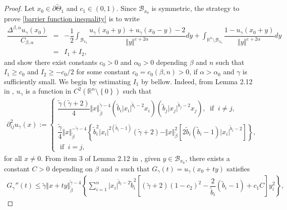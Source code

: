 \documentclass[10pt, leqno]{article}
\theoremstyle{definition}
\theoremstyle{remark}
\numberwithin{equation}{section}
\begin{document}
\begin{proof}
Let $x_{0} \in \partial \tilde{\Theta}_{1}$ and $c_{1} \in \left(0,1 \right)$. Since $\mathcal{B}_{x_{0}}$ is symmetric, the strategy to prove \eqref{barrier function inequality} is to write
\begin{eqnarray}
\label{barrier function inequality 1}
\dfrac{\Delta^{\beta, \alpha} u_{\gamma}(x_{0})}{C_{\beta, \alpha}}& = & \nonumber -\dfrac{1}{2}\displaystyle \int_{\mathcal{B}_{x_{0}}} \dfrac{u_{\gamma}\left( x_{0} + y \right) + u_{\gamma}\left( x_{0} - y \right) - 2}{\Vert y \Vert^{c_{} + 2\alpha}} dy + \displaystyle \int_{\mathbb{R}^{n} \setminus \mathcal{B}_{x_{0}}} \dfrac{1 - u_{\gamma}\left( x_{0} + y\right)}{\Vert y \Vert^{c_{} + 2\alpha}} dy \\
& = & I_{1} + I_{2},
\end{eqnarray}
and show there exist constants $c_{0} > 0$ and $\alpha_{0}>0$ depending $\beta$ and $n$ such that $I_{1} \geq c_{0}$ and $ I_{2}  \geq - c_{0}/2$ for some constant $c_{0}=c_{0}(\beta, n)>0$, if $\alpha > \alpha_{0}$ and $\gamma$ is sufficiently small. We begin by estimating $I_{1}$ by bellow. Indeed, from Lemma 2.12 in \cite{LEITAO LP}, $u_{\gamma}$ is a function in $C^{2}(\mathbb{R}^{n}\setminus \left\lbrace 0 \right\rbrace)$ such that
\begin{eqnarray}
\partial^{2}_{ij}u_{\gamma}(x):= \left \{
\begin{array}{ll}
\dfrac{\tilde{\gamma}(\tilde{\gamma}+2)}{4}\Vert x \Vert_{\tilde{\beta}}^{\tilde{\gamma} - 4} (\tilde{b}_{i}\vert x_{i}\vert^{\tilde{b}_{i}-2} x_{i}) (\tilde{b}_{j}\vert x_{j}\vert^{\tilde{b}_{j}-2} x_{j}), \ \text{ if } \ i \neq j, \\
\\
\dfrac{\tilde{\gamma}}{4}\Vert x \Vert_{\tilde{\beta}}^{-\tilde{\gamma} - 4} \left \lbrace \tilde{b}^{2}_{i}\vert x_{i} \vert^{2(\tilde{b}_{i} -1)} (\tilde{\gamma} + 2) - \Vert x \Vert^{2}_{\tilde{\beta}} \left [ 2\tilde{b}_{i}(\tilde{b}_{i} - 1) \vert x_{i} \vert^{\tilde{b}_{i}-2}\right] \right \rbrace, \\
 \text{ if } \  i = j,
\end{array}
\right.
\end{eqnarray}
for all $x \neq 0$. From item 3 of Lemma 2.12 in \cite{LEITAO LP}, given $y \in \mathcal{B}_{x_{0}}$, there exists a constant $C>0$ depending on $\beta$ and $n$ such that $G_{\gamma}(t) = u_{\gamma}(x_{0} + ty)$ satisfies
\begin{eqnarray}
\label{Bar. func. second derivat est.}
G_{\gamma}''(t) \leq \tilde{\gamma} \Vert x + t y \Vert_{\tilde{\beta}}^{\tilde{\gamma} - 4} \left \lbrace \displaystyle \sum_{i=1}^{n} \vert x_{i} \vert^{\tilde{b}_{i} -2}\tilde{b}^{2}_{i}\left[\left( \tilde{\gamma} + 2 \right) (1 - c_{2})^{2} - \dfrac{2}{\tilde{b}_{i}}(\tilde{b}_{i} - 1) + c_{1} C\right]y^{2}_{i} \right \rbrace,

\end{eqnarray}
\end{proof}
\end{document}
